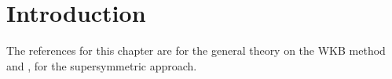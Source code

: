 \chapter*{Introduction}
\lipsum[1-4]

The references for this chapter are \cite{zwiebach}
for the general theory on the WKB method and \cite{cooper_main}, \cite{dutt_swkb}
for the supersymmetric approach.
